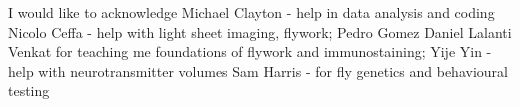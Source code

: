 
\begin{acknowledgements}      


I would like to acknowledge 
Michael Clayton - help in data analysis and coding
Nicolo Ceffa - help with light sheet imaging, flywork;
Pedro Gomez
Daniel 
Lalanti Venkat for teaching me foundations of flywork and immunostaining; 
Yije Yin - help with neurotransmitter volumes 
Sam Harris - for fly genetics and behavioural testing

\end{acknowledgements}